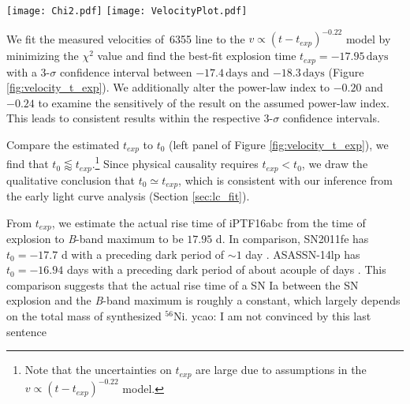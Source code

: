 \documentclass[twocolumn]{aastex61}
\newcommand{\ycao}[1]{{\color{red} ycao: {#1}}}
\begin{document}
\begin{figure*}[!thb]
  \centering
  \texttt{[image: Chi2.pdf]}
  \texttt{[image: VelocityPlot.pdf]}
  \caption{Constraints on $t_{exp}$ from fitting the velocity
    evolution of .
    \textit{Left panel:} the dashed, solid
    and dash-dotted curves show $\chi^2$ for fitting power laws with
    indices $-0.20$, $-0.22$ and $-0.24$, respectively. The red
    vertical line and the orange region indicate $t_0$ and its
    3-$\sigma$ confidence interval from Section
    \ref{sec:lc_fit}.
    \textit{Right panel:} Observed \,6355
    velocities and the best-fit power-law velocity with an index of
    $-0.22$.}
  \label{fig:velocity_t_exp}
\end{figure*}

We fit the measured velocities of \,6355 line to the
$v\propto(t-t_{exp})^{-0.22}$ model by minimizing the $\chi^2$ value
and find the best-fit explosion time $t_{exp}=-17.95\,\textrm{days}$
with a 3-$\sigma$ confidence interval between $-17.4\,\textrm{days}$
and $-18.3\,\textrm{days}$ (Figure \ref{fig:velocity_t_exp}). We additionally
alter the power-law index to $-0.20$ and $-0.24$ to examine the
sensitively of the result on the assumed power-law index.  This 
leads to consistent results within the respective 3-$\sigma$ 
confidence intervals.

Compare the estimated $t_{exp}$ to $t_0$ (left panel of Figure
\ref{fig:velocity_t_exp}), we find that $t_0\lessapprox t_{exp}$.\footnote{Note that the uncertainties on $t_{exp}$ are large due to assumptions in the $v\propto(t-t_{exp})^{-0.22}$ model.}
Since physical causality requires $t_{exp}<t_0$, we draw the qualitative
conclusion that $t_0\simeq t_{exp}$, which is consistent
with our inference from the early light curve analysis (Section
\ref{sec:lc_fit}).

From $t_{exp}$, we estimate the actual rise time of iPTF16abc from the
time of explosion to \textit{B}-band maximum to be $17.95$ d.  In
comparison, SN2011fe has $t_0=-17.7$ d \citep{2013A&A...554A..27P}
with a preceding dark period of $\sim 1$ day
\citep{2014ApJ...784...85P}. ASASSN-14lp has $t_0=-16.94$ days with a
preceding dark period of about acouple of days
\citep{2016ApJ...826..144S}. This comparison suggests that the actual
rise time of a SN Ia between the SN explosion and the \textit{B}-band
maximum is roughly a constant, which largely depends on the total mass
of synthesized $^{56}$Ni.\ycao{I am not convinced by this last sentence}
\end{document}
